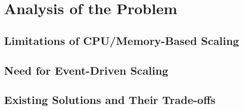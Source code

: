\chapter{Analysis of the Problem}
\label{cha:problem_analysis}

\section{Limitations of CPU/Memory-Based Scaling}

\section{Need for Event-Driven Scaling}

\section{Existing Solutions and Their Trade-offs}
